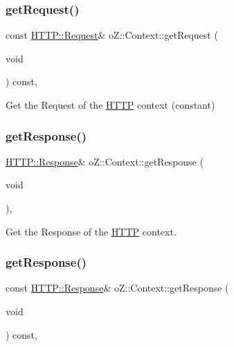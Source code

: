 \subsubsection{\texorpdfstring{getRequest()}{getRequest()}\hspace{0.1cm}{\footnotesize\ttfamily [2/2]}}
{\footnotesize\ttfamily const \mbox{\hyperlink{classo_z_1_1_h_t_t_p_1_1_request}{H\+T\+T\+P\+::\+Request}}\& o\+Z\+::\+Context\+::get\+Request (\begin{DoxyParamCaption}\item[{void}]{ }\end{DoxyParamCaption}) const\hspace{0.3cm}{\ttfamily [inline]}, {\ttfamily [noexcept]}}



Get the Request of the \mbox{\hyperlink{namespaceo_z_1_1_h_t_t_p}{H\+T\+TP}} context (constant) 

\mbox{\label{classo_z_1_1_context_ab656757ce56d11f39814747f1efe1f86}} 
\subsubsection{\texorpdfstring{getResponse()}{getResponse()}\hspace{0.1cm}{\footnotesize\ttfamily [1/2]}}
{\footnotesize\ttfamily \mbox{\hyperlink{classo_z_1_1_h_t_t_p_1_1_response}{H\+T\+T\+P\+::\+Response}}\& o\+Z\+::\+Context\+::get\+Response (\begin{DoxyParamCaption}\item[{void}]{ }\end{DoxyParamCaption})\hspace{0.3cm}{\ttfamily [inline]}, {\ttfamily [noexcept]}}



Get the Response of the \mbox{\hyperlink{namespaceo_z_1_1_h_t_t_p}{H\+T\+TP}} context. 

\mbox{\label{classo_z_1_1_context_aad384e516919b9c4faf5b702b85994af}} 
\subsubsection{\texorpdfstring{getResponse()}{getResponse()}\hspace{0.1cm}{\footnotesize\ttfamily [2/2]}}
{\footnotesize\ttfamily const \mbox{\hyperlink{classo_z_1_1_h_t_t_p_1_1_response}{H\+T\+T\+P\+::\+Response}}\& o\+Z\+::\+Context\+::get\+Response (\begin{DoxyParamCaption}\item[{void}]{ }\end{DoxyParamCaption}) const\hspace{0.3cm}{\ttfamily [inline]}, {\ttfamily [noexcept]}}



